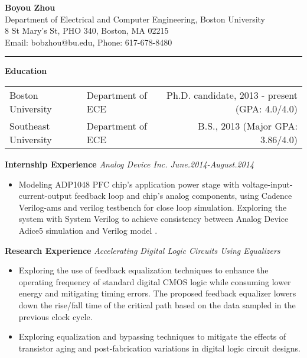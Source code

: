\documentclass[]{article}
\begin{document}
\pagestyle{empty}
\begin{center}
{\large\textbf{Boyou Zhou}}\\
Department of Electrical and Computer Engineering, Boston University\\
8 St Mary's St, PHO 340, Boston, MA 02215\\
Email: bobzhou@bu.edu, Phone: 617-678-8480\\
\rule[-0.1cm]{7.5in}{0.01cm}
\end{center}
%

\textbf{Education}
\vspace{-0.1in}
\begin{table*}[h]
  \begin{tabular}{p{2.0in}p{2.0in}r}
    Boston University& Department of ECE & Ph.D. candidate, 2013 - present
    (GPA: 4.0/4.0)\\ 
    Southeast University & Department of ECE & B.S., 2013
    (Major GPA: 3.86/4.0)\\ 
  \end{tabular}
  \label{tbl:1}
\end{table*}

\noindent \textbf{Internship Experience}
\textit{Analog Device Inc. June.2014-August.2014}
    \begin{itemize}
        \item Modeling ADP1048 PFC chip's application power stage with
        voltage-input-current-output feedback loop and chip's analog
        components, using Cadence Verilog-ams and verilog testbench for close
        loop simulation.  Exploring the system with System Verilog to achieve
        consistency between Analog Device Adice5 simulation and Verilog model . 
    \end{itemize}

\noindent \textbf{Research Experience}
\textit{Accelerating Digital Logic Circuits Using Equalizers}
		\begin{itemize}
            \item Exploring the use of feedback equalization techniques to
            enhance the operating frequency of standard digital CMOS logic
            while consuming lower energy and mitigating timing errors. The
                proposed feedback equalizer lowers down the rise/fall time of
                the critical path based on the data sampled in the previous
                clock cycle. 

            \item Exploring equalization and bypassing techniques to mitigate
            the effects of transistor aging and post-fabrication
            variations in digital logic circuit designs.
		\end{itemize}
\end{document}

